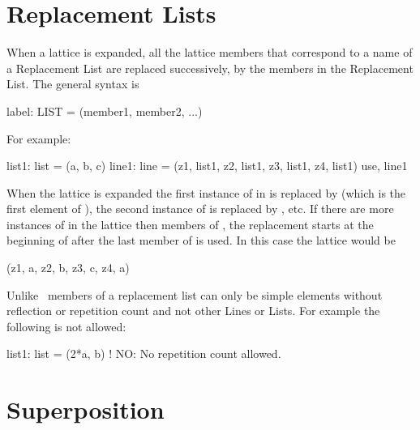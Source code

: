 \section{Replacement Lists}

When a lattice is expanded, all the lattice members that correspond to a 
name of a Replacement List 
are replaced successively, by the members
in the Replacement List. The general syntax is
\begin{example}
  label: LIST = (member1, member2, ...)
\end{example}
For example:
\begin{example}
  list1: list = (a, b, c)
  line1: line = (z1, list1, z2, list1, z3, list1, z4, list1)
  use, line1
\end{example}
When the lattice is expanded the first instance of  in
 is replaced by  (which is the first element of
), the second instance of  is replaced by ,
etc. If there are more instances of  in the lattice then
members of , the replacement starts at the beginning of
 after the last member of  is used. In this case the
lattice would be
\begin{example}
  (z1, a, z2, b, z3, c, z4, a)
\end{example}
Unlike \mad\, members of a replacement list can only be simple elements 
without reflection or repetition count and not other Lines or Lists. 
For example the following is not allowed:
\begin{example}
  list1: list = (2*a, b)  ! NO: No repetition count allowed.
\end{example}

\section{Superposition}
\label{s:super}

